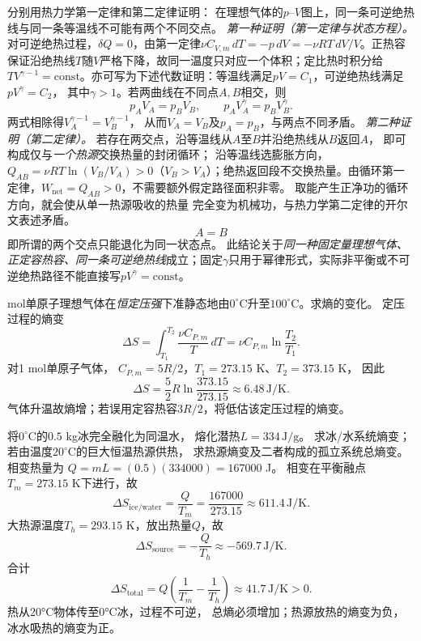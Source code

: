 \problemtext 分别用热力学第一定律和第二定律证明：
在理想气体的$p$--$V$图上，同一条可逆绝热线与同一条等温线不可能有两个不同交点。
\workings
\emph{第一种证明（第一定律与状态方程）。}
对可逆绝热过程，$\delta Q=0$，由第一定律$\nu C_{V,m}\,dT=-p\,dV=-\nu RT\,dV/V$。正热容保证沿绝热线$T$随$V$严格下降，故同一温度只对应一个体积；定比热时积分给$TV^{\gamma-1}=\mathrm{const}$。亦可写为下述代数证明：等温线满足$pV=C_1$，可逆绝热线满足$pV^\gamma=C_2$，
其中$\gamma>1$。若两曲线在不同点$A,B$相交，则
\[
p_AV_A=p_BV_B,\qquad
p_AV_A^\gamma=p_BV_B^\gamma.
\]
两式相除得$V_A^{\gamma-1}=V_B^{\gamma-1}$，
从而$V_A=V_B$及$p_A=p_B$，与两点不同矛盾。
\emph{第二种证明（第二定律）。}
若存在两交点，沿等温线从$A$至$B$并沿绝热线从$B$返回$A$，
即可构成仅与\emph{一个热源}交换热量的封闭循环；
沿等温线选膨胀方向，$Q_{AB}=\nu RT\ln(V_B/V_A)>0$（$V_B>V_A$）；绝热返回段不交换热量。由循环第一定律，$W_{\mathrm{net}}=Q_{AB}>0$，不需要额外假定路径面积非零。
取能产生正净功的循环方向，就会使从单一热源吸收的热量
完全变为机械功，与热力学第二定律的开尔文表述矛盾。
\[
\boxed{A=B}
\]
即所谓的两个交点只能退化为同一状态点。
\crosscheck 此结论关于\emph{同一种固定量理想气体、正定容热容、同一条可逆绝热线}成立；固定$\gamma$只用于幂律形式，实际非平衡或不可逆绝热路径不能直接写$pV^\gamma=\mathrm{const}$。

 mol单原子理想气体在\emph{恒定压强}下准静态地由$0^\circ$C升至$100^\circ$C。求熵的变化。
\workings
定压过程的熵变
\[
\Delta S=\int_{T_1}^{T_2}\frac{\nu C_{P,m}}T\,dT
=\nu C_{P,m}\ln\frac{T_2}{T_1}.
\]
对1 mol单原子气体，
$C_{P,m}=5R/2$，$T_1=273.15$ K、$T_2=373.15$ K，
因此
\[
\boxed{\Delta S=\frac52R\ln\frac{373.15}{273.15}
\approx6.48\,\mathrm{J/K}}.
\]
\crosscheck 气体升温故熵增；若误用定容热容$3R/2$，将低估该定压过程的熵变。

\problemtext 将$0^\circ$C的$0.5$ kg冰完全融化为同温水，
熔化潜热$L=334\,\mathrm{J/g}$。
求冰/水系统熵变；若由温度$20^\circ$C的巨大恒温热源供热，
求热源熵变及二者构成的孤立系统总熵变。
\workings
相变热量为
$Q=mL=(0.5)(334000)=167000$ J。
相变在平衡融点$T_m=273.15$ K下进行，故
\[
\boxed{\Delta S_{\mathrm{ice/water}}
=\frac{Q}{T_m}=\frac{167000}{273.15}
\approx611.4\,\mathrm{J/K}}.
\]
大热源温度$T_h=293.15$ K，放出热量$Q$，故
\[
\boxed{\Delta S_{\mathrm{source}}=-\frac{Q}{T_h}
\approx-569.7\,\mathrm{J/K}}.
\]
合计
\[
\boxed{\Delta S_{\mathrm{total}}
=Q\left(\frac1{T_m}-\frac1{T_h}\right)
\approx41.7\,\mathrm{J/K}>0}.
\]
\crosscheck 热从20°C物体传至0°C冰，过程不可逆，
总熵必须增加；热源放热的熵变为负，冰水吸热的熵变为正。


